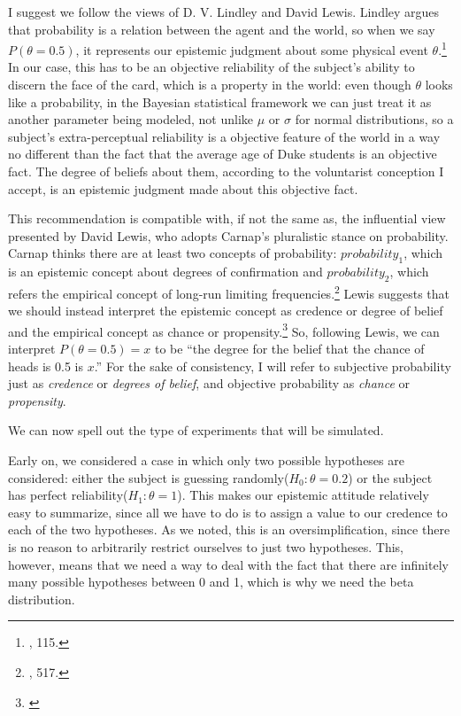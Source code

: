 I suggest we follow the views of D. V. Lindley and David Lewis. Lindley
argues that probability is a relation between the agent and the world,
so when we say \(P(\theta=0.5)\), it represents our epistemic judgment about some physical event \(\theta\).\footnote{\cite{lindleybern}, 115.} In our case, this
has to be an objective reliability of the subject's ability to discern the face of the card, which
is a property in the world: even though \(\theta\) looks like a
probability, in the Bayesian statistical framework we can just treat it
as another parameter being modeled, not unlike \(\mu\) or \(\sigma\) for
normal distributions, so a subject's extra-perceptual reliability is a
objective feature of the world in a way no different than the fact that
the average age of Duke students is an objective fact. The degree of
beliefs about them, according to the voluntarist conception I accept, is an epistemic judgment made about this objective fact.
 
 This recommendation is compatible with, if not the same as, the influential
view presented by David Lewis, who adopts Carnap's pluralistic stance on
probability. Carnap thinks there are at least two concepts of
probability: \(probability_1\), which is an epistemic concept about
degrees of confirmation and \(probability_2\), which refers the
empirical concept of long-run limiting frequencies.\footnote{\cite{carnapprob}, 517.} Lewis suggests
that we should instead interpret the epistemic concept as credence or
degree of belief and the empirical concept as chance or
propensity.\footnote{\cite{lewisguide}} So, following Lewis, we can interpret \(P(\theta=0.5)=x\) to
be ``the degree for the belief that the chance of heads is 0.5 is
\(x\).'' For the sake of consistency, I will refer to subjective
probability just as \emph{credence} or \emph{degrees of belief}, and
objective probability as \emph{chance} or \emph{propensity}.

We can now spell out the type of experiments that will be simulated.

Early on, we considered a case in which only two possible hypotheses are
considered: either the subject is guessing
randomly(\(H_0:\theta = 0.2\)) or the subject has perfect
reliability(\(H_1:\theta = 1\)). This makes our epistemic attitude
relatively easy to summarize, since all we have to do is to assign a
value to our credence to each of the two hypotheses. As we noted, this
is an oversimplification, since there is no reason to arbitrarily
restrict ourselves to just two hypotheses. This, however, means that we
need a way to deal with the fact that there are infinitely many possible
hypotheses between 0 and 1, which is why we need the beta distribution.

